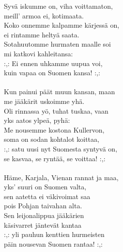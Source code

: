 
            Syvä iskumme on, viha voittamaton, \\
            meill’ armoa ei, kotimaata. \\
            Koko onnemme kalpamme kärjessä on, \\
            ei rintamme heltyä saata. \\
            Sotahuutomme hurmaten maalle soi \\
            mi katkovi kahleitansa: \\
            :,: Ei ennen uhkamme uupua voi, \\
            kuin vapaa on Suomen kansa! :,: \\
\hspace{10mm} \\
            Kun painui päät muun kansan, maan \\
            me jääkärit uskoimme yhä. \\
            Oli rinnassa yö, tuhat tuskaa, vaan \\
            yks aatos ylpeä, pyhä: \\
            Me nousemme kostona Kullervon, \\
            soma on sodan kohtalot koittaa, \\
            :,: satu uusi nyt Suomesta syntyvä on, \\
            se kasvaa, se ryntää, se voittaa! :,: \\
\hspace{10mm} \\
            Häme, Karjala, Vienan rannat ja maa, \\
            yks’ suuri on Suomen valta, \\
            sen aatetta ei väkivoimat saa \\
            pois Pohjan taivahan alta. \\
            Sen leijonalippua jääkärien \\
            käsivarret jäntevät kantaa \\
            :,: yli pauhun kenttien hurmeisten \\
            päin nousevan Suomen rantaa! :,: \\
